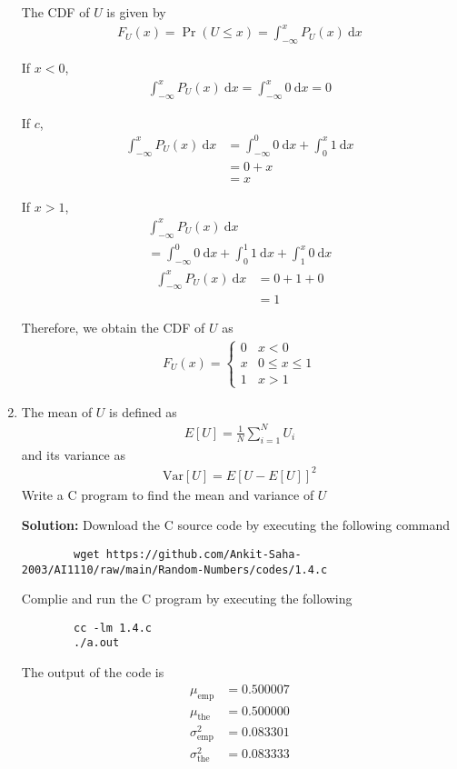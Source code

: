 \documentclass[journal,12pt,twocolumn]{IEEEtran}
\newcommand{\solution}{\noindent \textbf{Solution: }}
\providecommand{\pr}[1]{\ensuremath{\Pr\left(#1\right)}}
\providecommand{\mean}[1]{E\left[ #1 \right]}
\providecommand{\var}[1]{\mathrm{Var}\left[ #1 \right]}
\numberwithin{equation}{section}
\begin{document}
\begin{enumerate}[label=\thesection.\arabic*,ref=\thesection.\theenumi]
	The CDF of $U$ is given by
	\begin{align}
		F_{U}(x) = \pr{U \le x} = \int_{-\infty}^x P_{U}(x) ~\mathrm{d}x
	\end{align}
	
	If $x<0$,
	\begin{align}
		\int_{-\infty}^x P_{U}(x) ~\mathrm{d}x = \int_{-\infty}^x 0 ~\mathrm{d}x = 0
	\end{align}
	
	If $c$,
	\begin{align}
		\int_{-\infty}^x P_{U}(x) ~\mathrm{d}x &= \int_{-\infty}^0 0 ~\mathrm{d}x + \int_0^x 1 ~\mathrm{d}x \\
		&= 0 + x \\
		&= x
	\end{align}
	
	If $x>1$,
	\begin{multline}
		\int_{-\infty}^x P_{U}(x) ~\mathrm{d}x \\= \int_{-\infty}^0 0 ~\mathrm{d}x + \int_0^1 1 ~\mathrm{d}x +  \int_1^x 0 ~\mathrm{d}x 
	\end{multline}
	\begin{align}
		\int_{-\infty}^x P_{U}(x) ~\mathrm{d}x &= 0 + 1 + 0 \\
		&= 1
	\end{align}
	
	Therefore, we obtain the CDF of $U$ as
	\begin{align}
		F_{U}(x) = 
		\begin{cases}
			0 & x < 0 \\
			x & 0 \le x \le 1 \\
			1 & x > 1
		\end{cases}
	\end{align}
	
	\item The mean of $U$ is defined as
	\begin{align}
		\mean{U} = \frac{1}{N}\sum_{i=1}^{N}U_i
	\end{align}
	and its variance as
	\begin{align}
		\var{U} = \mean{U- \mean{U}}^2 
	\end{align}
	Write a C program to  find the mean and variance of $U$
	
	\solution Download the C source code by executing the following command
	\begin{lstlisting}
		wget https://github.com/Ankit-Saha-2003/AI1110/raw/main/Random-Numbers/codes/1.4.c
	\end{lstlisting}
	Complie and run the C program by executing the following
	\begin{lstlisting}
		cc -lm 1.4.c
		./a.out
	\end{lstlisting}
	The output of the code is
	\begin{align}
		\mu_{\text{emp}} &= 0.500007 \\
		\mu_{\text{the}} &= 0.500000 \\
		\sigma_{\text{emp}}^2 &= 0.083301 \\
		\sigma_{\text{the}}^2 &= 0.083333
	\end{align}
	

\end{enumerate}
\end{document}
